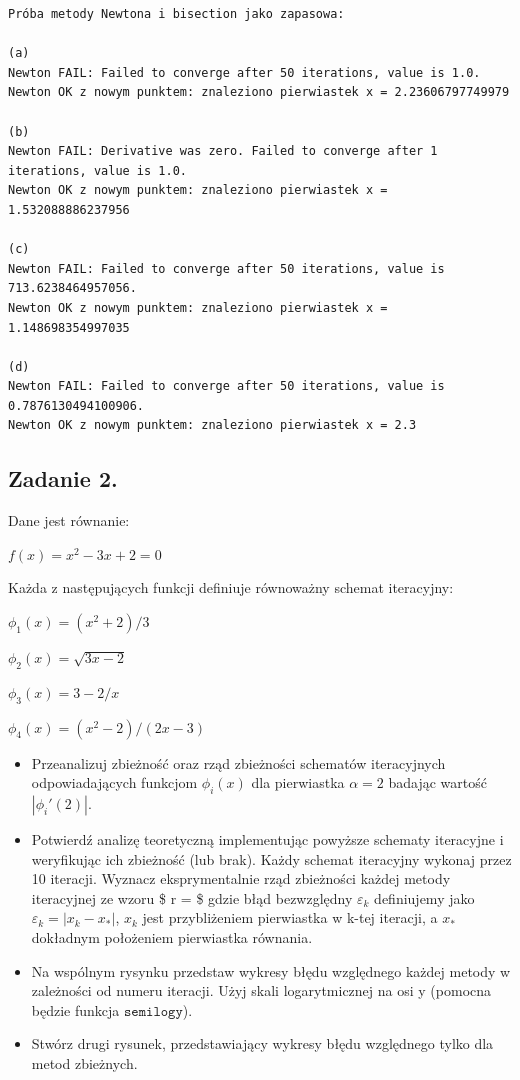 \documentclass[
  letterpaper,
  DIV=11,
  numbers=noendperiod]{scrartcl}
\providecommand{\tightlist}{%
  \setlength{\itemsep}{0pt}\setlength{\parskip}{0pt}}\usepackage{longtable,booktabs,array}
\begin{document}
\begin{verbatim}
Próba metody Newtona i bisection jako zapasowa:

(a)
Newton FAIL: Failed to converge after 50 iterations, value is 1.0.
Newton OK z nowym punktem: znaleziono pierwiastek x = 2.23606797749979

(b)
Newton FAIL: Derivative was zero. Failed to converge after 1 iterations, value is 1.0.
Newton OK z nowym punktem: znaleziono pierwiastek x = 1.532088886237956

(c)
Newton FAIL: Failed to converge after 50 iterations, value is 713.6238464957056.
Newton OK z nowym punktem: znaleziono pierwiastek x = 1.148698354997035

(d)
Newton FAIL: Failed to converge after 50 iterations, value is 0.7876130494100906.
Newton OK z nowym punktem: znaleziono pierwiastek x = 2.3
\end{verbatim}

\subsection{Zadanie 2.}\label{zadanie-2.}

Dane jest równanie:

\(f(x) = x^2 - 3x + 2 = 0\)

Każda z następujących funkcji definiuje równoważny schemat iteracyjny:

\(\phi_1(x) = (x^2 + 2)/3\)

\(\phi_2(x) = \sqrt{3x - 2}\)

\(\phi_3(x) = 3 - 2/x\)

\(\phi_4(x) = (x^2 - 2)/(2x - 3)\)

\begin{itemize}
\tightlist
\item
  Przeanalizuj zbieżność oraz rząd zbieżności schematów iteracyjnych
  odpowiadających funkcjom \(\phi_i(x)\) dla pierwiastka \(\alpha = 2\)
  badając wartość \(|\phi_i'(2)|\).
\item
  Potwierdź analizę teoretyczną implementując powyższe schematy
  iteracyjne i weryfikując ich zbieżność (lub brak). Każdy schemat
  iteracyjny wykonaj przez 10 iteracji. Wyznacz eksprymentalnie rząd
  zbieżności każdej metody iteracyjnej ze wzoru \$ r =
  \$
  gdzie błąd bezwzględny \(\varepsilon_k\) definiujemy jako
  \(\varepsilon_k=|x_k-x_*|\), \(x_k\) jest przybliżeniem pierwiastka w
  k-tej iteracji, a \(x_*\) dokładnym położeniem pierwiastka równania.
\item
  Na wspólnym rysynku przedstaw wykresy błędu względnego każdej metody w
  zależności od numeru iteracji. Użyj skali logarytmicznej na osi y
  (pomocna będzie funkcja \(\texttt{semilogy}\)).
\item
  Stwórz drugi rysunek, przedstawiający wykresy błędu względnego tylko
  dla metod zbieżnych.
\end{itemize}
\end{document}
